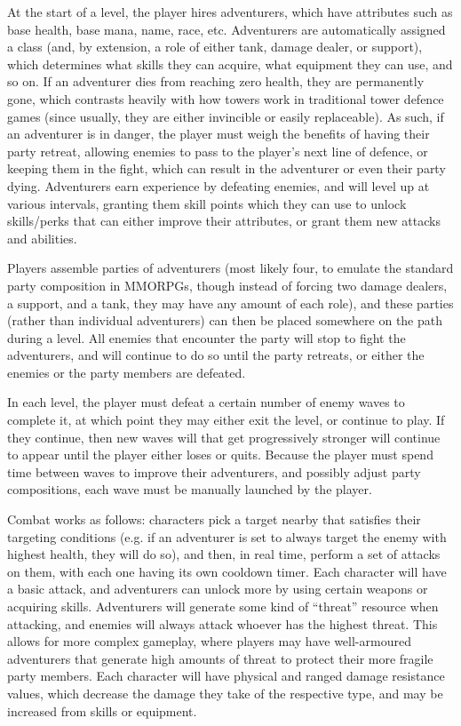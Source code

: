 \documentclass[10pt]{article}
\begin{document}
At the start of a level, the player hires adventurers, which have attributes such as base health, base mana, name, race, etc. Adventurers are
automatically assigned a class (and, by extension, a role of either tank, damage dealer, or support), which determines what skills they can acquire,
what equipment they can use, and so on. If an adventurer dies from reaching zero health, they are permanently gone, which contrasts heavily with how
towers work in traditional tower defence games (since usually, they are either invincible or easily replaceable). As such, if an adventurer is in danger,
the player must weigh the benefits of having their party retreat, allowing enemies to pass to the player's next line of defence, or keeping them
in the fight, which can result in the adventurer or even their party dying. Adventurers earn experience by defeating enemies, and will level up
at various intervals, granting them skill points which they can use to unlock skills/perks that can either improve their attributes, or grant them
new attacks and abilities.

Players assemble parties of adventurers (most likely four, to emulate the standard party composition in MMORPGs, though instead of forcing two damage
dealers, a support, and a tank, they may have any amount of each role), and these parties (rather than individual adventurers) can then be placed
somewhere on the path during a level. All enemies that encounter the party will stop to fight the adventurers, and will continue to do so until the party
retreats, or either the enemies or the party members are defeated.

In each level, the player must defeat a certain number of enemy waves to complete it, at which point they may either exit the level,
or continue to play. If they continue, then new waves will that get progressively stronger will continue to appear until the player either loses
or quits. Because the player must spend time between waves to improve their adventurers, and possibly adjust party compositions, each wave
must be manually launched by the player.

Combat works as follows: characters pick a target nearby that satisfies their targeting conditions (e.g. if an adventurer is set to always target
the enemy with highest health, they will do so), and then, in real time, perform a set of attacks on them, with each one having its own cooldown timer.
Each character will have a basic attack, and adventurers can unlock more by using certain weapons or acquiring skills. Adventurers will generate
some kind of ``threat'' resource when attacking, and enemies will always attack whoever has the highest threat. This allows for more complex gameplay,
where players may have well-armoured adventurers that generate high amounts of threat to protect their more fragile party members. Each character
will have physical and ranged damage resistance values, which decrease the damage they take of the respective type, and may be increased
from skills or equipment.
\end{document}
